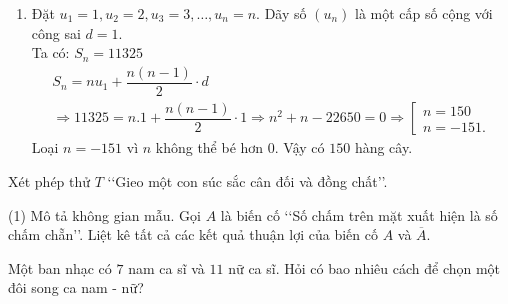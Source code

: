 \begin{ex}
{\begin{enumerate}
			\[q\cdot(q-1)=2\Leftrightarrow q^2-q=2\Leftrightarrow q^2-q-2=0\Leftrightarrow \left[\begin{array}{l} {q=2} \\ {q=-1.} \end{array}\right.\] Với $q=2$ thay vào (1) ta được $v_1=1$.\\			
			Với $q=-1$ thay vào (1) ta được $v_1=7$.\\			
			Vậy số hạng đầu $v_1=1$ và công bội $q=2$ hoặc số hạng đầu $v_1=7$ và công bội $q=-1$.			
			\item  Đặt $u_1=1, u_2=2, u_3=3,\dots, u_n=n$. Dãy số $(u_n )$ là một cấp số cộng với công sai $d = 1$.\\
			Ta có: $S_n=11325$
			\[\begin{array}{l} {S_n=nu_1+\dfrac{n(n-1)}{2}\cdot d} \\ {\Rightarrow 11325=n.1+\dfrac{n(n-1)}{2}\cdot 1\Rightarrow n^2+n-22650=0\Rightarrow \left[\begin{array}{l} {n=150} \\ {n=-151.} \end{array}\right.} \end{array}\] Loại $n=-151$ vì $n$ không thể bé hơn $0$. Vậy có $150$ hàng cây.
		\end{enumerate}
	}
	\end{ex}

\begin{vd}%
	Xét phép thử $T$ \lq\lq Gieo một con súc sắc cân đối và đồng chất\rq\rq. 
	\begin{tasks}(1)
		\task Mô tả không gian mẫu.
		\task Gọi $A$ là biến cố \lq\lq Số chấm trên mặt xuất hiện là số chấm chẵn\rq\rq. Liệt kê tất cả các kết quả thuận lợi của biến cố $A$ và $\overline{A}$.
	\end{tasks}
	\loigiai{
		
	}
\end{vd}

\begin{ex}%
Một ban nhạc có $7$ nam ca sĩ và $11$ nữ ca sĩ. Hỏi có bao nhiêu cách để chọn một đôi song ca nam - nữ?\\
\end{ex}

